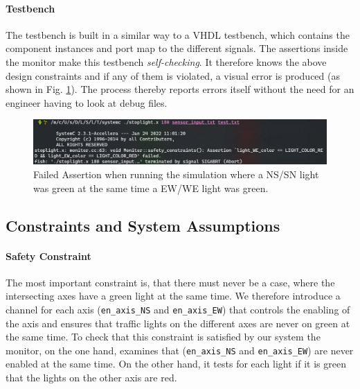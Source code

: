 \documentclass[10pt,bibliography=totocnumbered,listof=totocnumbered, footsepline, headsepline]{scrreprt}
\begin{document}
    \paragraph*{Testbench} The testbench is built in a similar way to a VHDL testbench, which contains the component instances and port map to the different signals.
    The assertions inside the monitor make this testbench \textit{self-checking}. It therefore knows the above design constraints and if any of them is violated, a visual error is produced (as shown in Fig. \ref{fig:assertion_failed}). The process thereby reports errors itself without the need for an engineer having to look at debug files.
    
    \begin{figure}[H]
    	\centerline{\includegraphics[width=38pc]{assertion_failed.png}}
    	\caption{Failed Assertion when running the simulation where a NS/SN light was green at the same time a EW/WE light was green.}
    	\label{fig:assertion_failed}
    \end{figure}
    
    
    
    
    \subsection{Constraints and System Assumptions}
        \paragraph*{Safety Constraint}
        The most important constraint is, that there must never be a case, where the intersecting axes have a green light at the same time. We therefore introduce a channel for each axis (\texttt{en\_axis\_NS} and \texttt{en\_axis\_EW}) that controls the enabling of the axis and ensures that traffic lights on the different axes are never on green at the same time. To check that this constraint is satisfied by our system the monitor, on the one hand, examines that (\texttt{en\_axis\_NS} and \texttt{en\_axis\_EW}) are never enabled at the same time. On the other hand, it tests for each light if it is green that the lights on the other axis are red.
            
\end{document}
